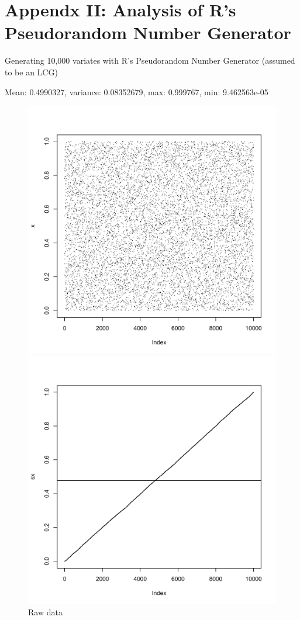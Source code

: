 \documentclass[11pt]{article}
\begin{document}
\newpage
\section{Appendx II: Analysis of R's Pseudorandom Number Generator}

Generating 10,000 variates with R's Pseudorandom Number Generator (assumed to be an LCG)

Mean: 0.4990327, variance: 0.08352679, max: 0.999767, min: 9.462563e-05

\begin{figure}[ht]
\begin{minipage}[b]{0.45\linewidth}
\centering
\includegraphics[scale=.42]{rRaw.pdf}
\caption{Raw data}
\label{fig:figure1}
\end{minipage}
\begin{minipage}[b]{0.45\linewidth}
\centering
\includegraphics[scale=.42]{rCDF.pdf}

\end{minipage}
\end{figure}
\end{document}
